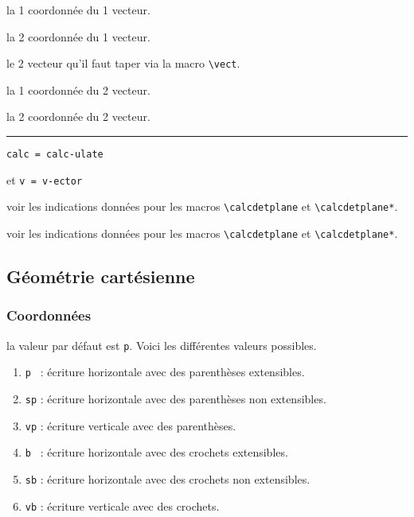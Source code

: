 \documentclass[12pt,a4paper]{article}
\newcommand\env[1]{\texttt{#1}}
\newcommand\macro[1]{\env{\textbackslash{}#1}}
\theoremstyle{definition}
\newcommand\separation{
	\medskip
	\hfill\rule{0.5\textwidth}{0.75pt}\hfill
	\medskip
}
\newcommand\mwhyprefix[2]{%
	\texttt{#1 = #1-#2}%
}
\begin{document}
 la 1\iere{} coordonnée du 1\ier{} vecteur.

 la 2\ieme{} coordonnée du 1\ier{} vecteur.

 le 2\ieme{} vecteur qu'il faut taper via la macro \macro{vect}.

 la 1\iere{} coordonnée du 2\ieme{} vecteur.

 la 2\ieme{} coordonnée du 2\ieme{} vecteur.


\separation


 \hfill \mwhyprefix{calc}{ulate}
                                   et \mwhyprefix{v}{ector}



\IDoption{} voir les indications données pour les macros \macro{calcdetplane} et \macro{calcdetplane*}.

 voir les indications données pour les macros \macro{calcdetplane} et \macro{calcdetplane*}.


\subsection{Géométrie cartésienne}

\subsubsection{Coordonnées} \label{tnsgeo-coordinates}



\label{tnsgeo-coordinates-tech}



\IDoption{} la valeur par défaut est \verb+p+. Voici les différentes valeurs possibles.
\begin{enumerate}
	\item \verb+p + : écriture horizontale avec des parenthèses extensibles.

	\item \verb+sp+ : écriture horizontale avec des parenthèses non extensibles.

	\item \verb+vp+ : écriture verticale avec des parenthèses.

	\item \verb+b + : écriture horizontale avec des crochets extensibles.

	\item \verb+sb+ : écriture horizontale avec des crochets non extensibles.

	\item \verb+vb+ : écriture verticale avec des crochets.
\end{enumerate}
\end{document}
